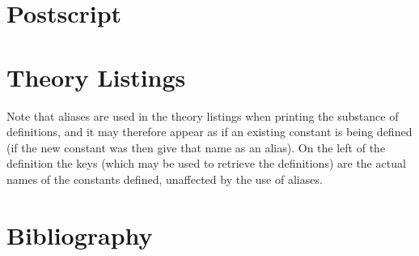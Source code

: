 
\section{Postscript}\label{POSTSCRIPT}

\appendix

\vfill

\section{Theory Listings}

Note that aliases are used in the theory listings when printing the substance of definitions, and it may therefore appear as if an existing constant is being defined (if the new constant was then give that name as an alias).
On the left of the definition the keys (which may be used to retrieve the definitions) are the actual names of the constants defined, unaffected by the use of aliases.

{
\let\Section\subsection
\let\Subsection\subsubsection
\def\subsection#1{\Subsection*{#1}}

\def\section#1{\Section{#1}\label{t045}}

}  %

\pagebreak

\section*{Bibliography}\label{BIBLIOGRAPHY}

{\def\section*#1{\ignore{#1}}
\raggedright


} %

{
{\small\printindex}}



